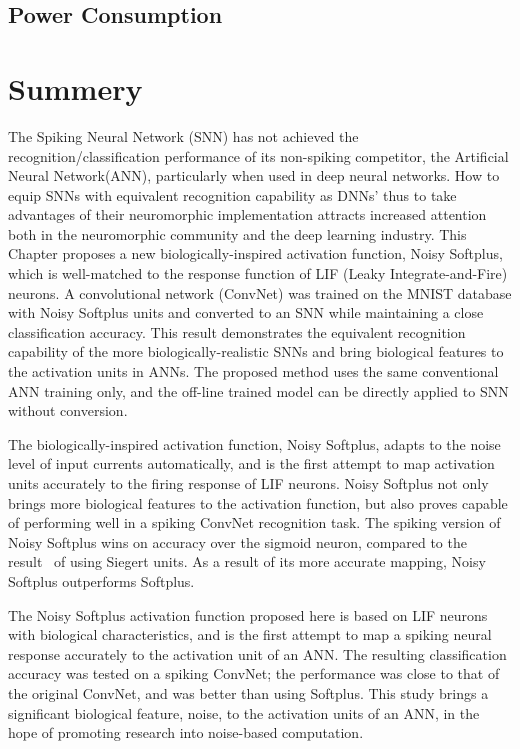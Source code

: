 	\subsection{Power Consumption}
\section{Summery}
	The Spiking Neural Network (SNN) has not achieved the recognition/classification performance of its non-spiking competitor, the Artificial Neural Network(ANN), particularly when used in deep neural networks.
	How to equip SNNs with equivalent recognition capability as DNNs' thus to take advantages of their neuromorphic implementation attracts increased attention both in the neuromorphic community and the deep learning industry.
	This Chapter proposes a new biologically-inspired activation function, Noisy Softplus, which is well-matched to the response function of LIF (Leaky Integrate-and-Fire) neurons.
	A convolutional network (ConvNet) was trained on the MNIST database with Noisy Softplus units and converted to an SNN while maintaining a close classification accuracy.
	This result demonstrates the equivalent recognition capability of the more biologically-realistic SNNs and bring biological features to the activation units in ANNs.
	The proposed method uses the same conventional ANN training only, and the off-line trained model can be directly applied to SNN without conversion.
	
	The biologically-inspired activation function, Noisy Softplus, adapts to the noise level of input currents automatically, and is the first attempt to map activation units accurately to the firing response of LIF neurons.
	Noisy Softplus not only brings more biological features to the activation function, but also proves capable of performing well in a spiking ConvNet recognition task.
	The spiking version of Noisy Softplus wins on accuracy over the sigmoid neuron, compared to the result~\cite{Stromatias2015scalable} of using Siegert units.
	As a result of its more accurate mapping, Noisy Softplus outperforms Softplus.
	
	The Noisy Softplus activation function proposed here is based on LIF neurons with biological characteristics, and is the first attempt to map a spiking neural response accurately to the activation unit of an ANN.
	The resulting classification accuracy was tested on a spiking ConvNet; the performance was close to that of the original ConvNet, and was better than using Softplus.
	This study brings a significant biological feature, noise, to the activation units of an ANN, in the hope of promoting research into noise-based computation.
	
